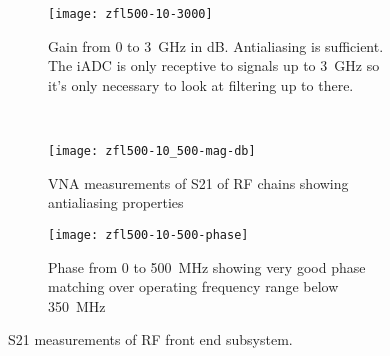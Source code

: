 \begin{figure}
  \centering
  \begin{subfigure}{\textwidth}
    \centering
    \texttt{[image: zfl500-10-3000]}
    \caption{Gain from 0 to \SI{3}{\giga\hertz} in dB. Antialiasing is sufficient. The iADC is only receptive to signals up to \SI{3}{\giga\hertz} so it's only necessary to look at filtering up to there.}
  \end{subfigure}\\[1em]
  \begin{subfigure}{\textwidth}
    \centering
    \texttt{[image: zfl500-10\_500-mag-db]}
    \caption{VNA measurements of S21 of RF chains showing antialiasing properties}
  \end{subfigure}
  \begin{subfigure}{\textwidth}
    \centering
    \texttt{[image: zfl500-10-500-phase]}
    \caption{Phase from 0 to \SI{500}{\mega\hertz} showing very good phase matching over operating frequency range below \SI{350}{\mega\hertz}}
  \end{subfigure}
  \caption{S21 measurements of RF front end subsystem.}
  \label{fig:rf-front-end:vna-measurements}
\end{figure}
